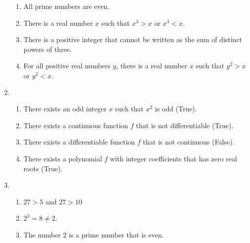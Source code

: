 \documentclass[a4paper]{article}
\begin{document}
\begin{enumerate}
	\begin{enumerate}
	\item
	
	All prime numbers are even.
	
	\item
	
	There is a real number $x$ such that $x^3>x$ or $x^3<x$.
	
	\item
	
	There is a positive integer that cannot be written as the
	sum of distinct powers of three.
	
	\item
	
	For all positive real numbers $y$, there is a real number
	$x$ such that $y^2 > x$ or $y^2 < x$. 
	\end{enumerate}
	
\item
	\begin{enumerate}
	\item
	
	There exists an odd integer $x$ such that $x^2$ is odd
	(True).
	
	\item 
	
	There exists a continuous function $f$ that is not
	differentiable (True).
	
	\item
	
	There exists a differentiable function $f$ that is not
	continuous (False).
	
	\item
	
	There exists a polynomial $f$ with integer coefficients
	that has zero real roots (True).
	\end{enumerate}
	
\item
	\begin{enumerate}
	\item
	
	$27 > 5$ and $27 > 10$
	
	\item 
	
	$2^3 = 8 \neq 2$.
	
	\item
	
	The number 2 is a prime number that is even.
	

\end{enumerate}
\end{enumerate}
\end{document}
